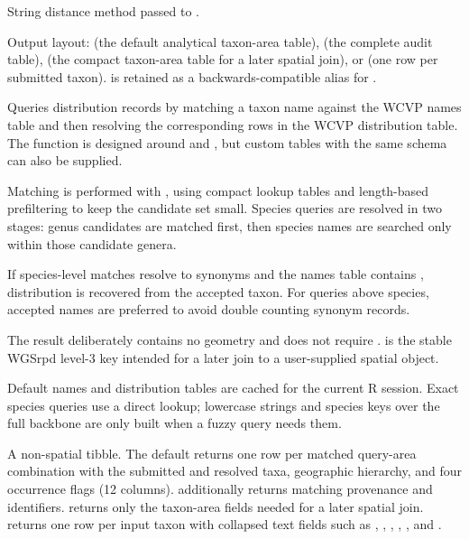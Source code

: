 \documentclass[a4paper]{book}
\begin{document}
\begin{Arguments}
\begin{ldescription}
\item[\code{method}] String distance method passed to .

\item[\code{output}] Output layout:  (the default analytical
taxon-area table),  (the complete audit table), 
(the compact taxon-area table for a later spatial join), or 
(one row per submitted taxon).  is retained as
a backwards-compatible alias for .
\end{ldescription}
\end{Arguments}
%
\begin{Details}
Queries distribution records by matching a taxon name against the WCVP names
table and then resolving the corresponding rows in the WCVP distribution
table. The function is designed around  and
, but custom tables with the same
schema can also be supplied.

Matching is performed with , using compact lookup tables and
length-based prefiltering to keep the candidate set small. Species queries are
resolved in two stages: genus candidates are matched first, then species
names are searched only within those candidate genera.

If species-level matches resolve to synonyms and the names table contains
, distribution is recovered from the accepted taxon.
For queries above species, accepted names are preferred to avoid double
counting synonym records.

The result deliberately contains no geometry and does not require .
 is the stable WGSrpd level-3 key intended for a later join
to a user-supplied spatial object.

Default names and distribution tables are cached for the current R session.
Exact species queries use a direct lookup; lowercase strings and species
keys over the full backbone are only built when a fuzzy query needs them.
\end{Details}
%
\begin{Value}
A non-spatial tibble. The default  returns one
row per matched query-area combination with the submitted and resolved
taxa, geographic hierarchy, and four occurrence flags (12 columns).
additionally returns matching provenance and identifiers.  returns
only the taxon-area fields needed for a later spatial join.  returns one row per input taxon with collapsed text fields such
as , , , , , and
.
\end{Value}
\end{document}
